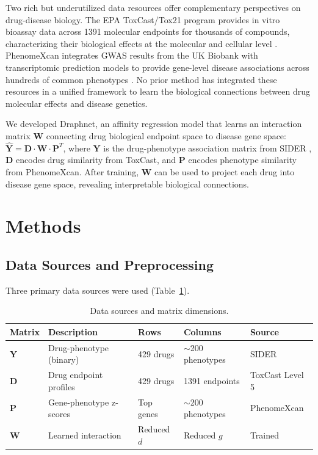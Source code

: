 \documentclass[12pt]{article}
\begin{document}
Two rich but underutilized data resources offer complementary perspectives on drug-disease biology. The EPA ToxCast/Tox21 program provides in vitro bioassay data across 1391 molecular endpoints for thousands of compounds, characterizing their biological effects at the molecular and cellular level \citep{richard2020toxcast}. PhenomeXcan integrates GWAS results from the UK Biobank with transcriptomic prediction models to provide gene-level disease associations across hundreds of common phenotypes \citep{pividori2020phenomexcan, bycroft2018ukbiobank, barbeira2018multixcan}. No prior method has integrated these resources in a unified framework to learn the biological connections between drug molecular effects and disease genetics.

We developed Draphnet, an affinity regression model that learns an interaction matrix $\mathbf{W}$ connecting drug biological endpoint space to disease gene space: $\hat{\mathbf{Y}} = \mathbf{D} \cdot \mathbf{W} \cdot \mathbf{P}^T$, where $\mathbf{Y}$ is the drug-phenotype association matrix from SIDER \citep{kuhn2016sider}, $\mathbf{D}$ encodes drug similarity from ToxCast, and $\mathbf{P}$ encodes phenotype similarity from PhenomeXcan. After training, $\mathbf{W}$ can be used to project each drug into disease gene space, revealing interpretable biological connections.

\section{Methods}

\subsection{Data Sources and Preprocessing}

Three primary data sources were used (Table~\ref{tab:data}).

\begin{table}[htbp]
\centering
\caption{Data sources and matrix dimensions.}
\label{tab:data}
\begin{tabular}{lllll}
\toprule
Matrix & Description & Rows & Columns & Source \\
\midrule
$\mathbf{Y}$ & Drug-phenotype (binary) & 429 drugs & $\sim$200 phenotypes & SIDER \\
$\mathbf{D}$ & Drug endpoint profiles & 429 drugs & 1391 endpoints & ToxCast Level 5 \\
$\mathbf{P}$ & Gene-phenotype z-scores & Top genes & $\sim$200 phenotypes & PhenomeXcan \\
$\mathbf{W}$ & Learned interaction & Reduced $d$ & Reduced $g$ & Trained \\
\bottomrule
\end{tabular}
\end{table}
\end{document}

